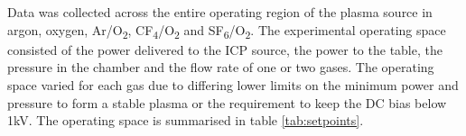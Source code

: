 \documentclass[10pt]{iopart}
\begin{document}
Data was collected across the entire operating region of the plasma source in argon, oxygen, Ar/O\textsubscript{2}, CF\textsubscript{4}/O\textsubscript{2} and SF\textsubscript{6}/O\textsubscript{2}. The experimental operating space consisted of the power delivered to the ICP source, the power to the table, the pressure in the chamber and the flow rate of one or two gases. The operating space varied for each gas due to differing lower limits on the minimum power and pressure to form a stable plasma or the requirement to keep the DC bias below 1kV. The operating space is summarised in table \ref{tab:setpoints}.



 




\end{document}

